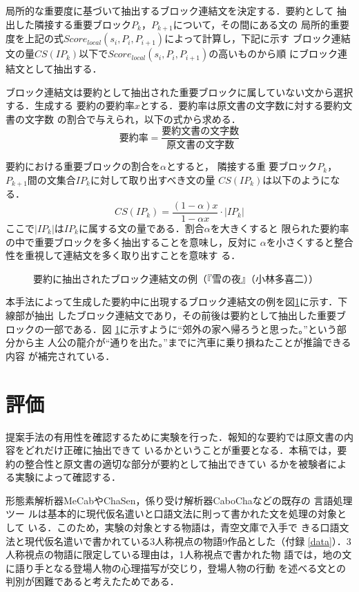 \documentclass[japanese]{jnlp_1.4}
\begin{document}
  局所的な重要度に基づいて抽出するブロック連結文を決定する．要約として
  抽出した隣接する重要ブロック$P_k$，$P_{k+1}$について，その間にある文の
  局所的重要度を上記の式$Score_{local}(s_{i},P_i,P_{i+1})$によって計算し，下記に示す
  ブロック連結文の量$CS(IP_k)$以下で$Score_{local}(s_{i},P_i,P_{i+1})$の高いものから順
  にブロック連結文として抽出する．

  ブロック連結文は要約として抽出された重要ブロックに属していない文から選択する．生成する
  要約の要約率$x$とする．要約率は原文書の文字数に対する要約文書の文字数
  の割合で与えられ，以下の式から求める．
  \[
   要約率=\frac{要約文書の文字数}{原文書の文字数}
  \]

要約における重要ブロックの割合を$\alpha$とすると，
  隣接する重
  要ブロック$P_k$，$P_{k+1}$間の文集合$IP_k$に対して取り出すべき文の量
  $CS(IP_k)$は以下のようになる．
  \[
  CS(IP_k)=\frac{(1-\alpha)x}{1-\alpha x}\cdot |IP_k|
  \]
  ここで$|IP_k|$は$IP_k$に属する文の量である．割合$\alpha$を大きくすると
  限られた要約率の中で重要ブロックを多く抽出することを意味し，反対に
  $\alpha$を小さくすると整合性を重視して連結文を多く取り出すことを意味す
  る．

   \begin{figure}[t]

\vspace{-1\baselineskip}
\caption{要約に抽出されたブロック連結文の例（『雪の夜』（小林多喜二））}\label{conrei}
  \end{figure}

  本手法によって生成した要約中に出現するブロック連結文の例を図\ref{conrei}に示す．下線部が抽出
  したブロック連結文であり，その前後は要約として抽出した重要ブロックの一部である．図
  \ref{conrei}に示すように“郊外の家へ帰ろうと思った。”という部分から主
  人公の龍介が“通りを出た。”までに汽車に乗り損ねたことが推論できる内容
  が補完されている．


 \section{評価}\label{eval}

 提案手法の有用性を確認するために実験を行った．報知的な要約では原文書の内容をどれだけ正確に抽出できて
 いるかということが重要となる．本稿では，要約の整合性と原文書の適切な部分が要約として抽出できてい
 るかを被験者による実験によって確認する．

 形態素解析器MeCabやChaSen，係り受け解析器CaboChaなどの既存の
 言語処理ツー
 ルは基本的に現代仮名遣いと口語文法に則って書かれた文を処理の対象として
 いる．このため，実験の対象とする物語は，青空文庫で入手で
 きる口語文法と現代仮名遣いで書かれている3人称視点の物語9作品とした（付録 \ref{data}）．3人称視点の物語に限定している理由は，1人称視点で書かれた物
 語では，地の文に語り手となる登場人物の心理描写が交じり，登場人物の行動
 を述べる文との判別が困難であると考えたためである．
\end{document}
